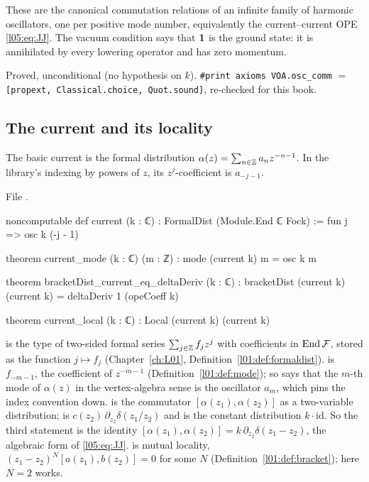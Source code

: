 \begin{physics}
These are the canonical commutation relations of an infinite family of harmonic oscillators, one per
positive mode number, equivalently the current--current OPE \eqref{l05:eq:JJ}. The vacuum condition says
that $\mathbf{1}$ is the ground state: it is annihilated by every lowering operator and has zero momentum.
\end{physics}

\begin{status}
Proved, unconditional (no hypothesis on $k$). \texttt{\#print axioms VOA.osc\_comm} $=$
\texttt{[propext, Classical.choice, Quot.sound]}, re-checked for this book.
\end{status}

\subsection{The current and its locality}

\begin{definition}\label{l05:def:current}
The basic current is the formal distribution $\alpha(z)=\sum_{n\in{\mathbb{Z}}}a_nz^{-n-1}$. In the library's
indexing by powers of $z$, its $z^j$-coefficient is $a_{-j-1}$.
\end{definition}

\noindent File .
\begin{leancode}
noncomputable def current (k : ℂ) : FormalDist (Module.End ℂ Fock) := fun j => osc k (-j - 1)

theorem current_mode (k : ℂ) (m : ℤ) : mode (current k) m = osc k m

theorem bracketDist_current_eq_deltaDeriv (k : ℂ) :
    bracketDist (current k) (current k) = deltaDeriv 1 (opeCoeff k)

theorem current_local (k : ℂ) : Local (current k) (current k)
\end{leancode}

\begin{dictionary}
 is the type of two-sided formal series $\sum_{j\in{\mathbb{Z}}}f_jz^j$ with
coefficients in $\operatorname{End}\mathcal{F}$, stored as the function $j\mapsto f_j$ (Chapter~\ref{ch:L01},
Definition~\ref{l01:def:formaldist}).  is $f_{-m-1}$, the coefficient of $z^{-m-1}$
(Definition~\ref{l01:def:mode}); so  says that the $m$-th mode of $\alpha(z)$ in the
vertex-algebra sense is the oscillator $a_m$, which pins the index convention down. 
is the commutator $[\alpha(z_1),\alpha(z_2)]$ as a two-variable distribution;  is
$c(z_2)\,\partial_{z_2}\delta(z_1/z_2)$ and  is the constant distribution $k\cdot\mathrm{id}$.
So the third statement is the identity
$[\alpha(z_1),\alpha(z_2)]=k\,\partial_{z_2}\delta(z_1-z_2)$, the algebraic form of \eqref{l05:eq:JJ}.
 is mutual locality, $(z_1-z_2)^N[a(z_1),b(z_2)]=0$ for some $N$
(Definition~\ref{l01:def:bracket}); here $N=2$ works.
\end{dictionary}

